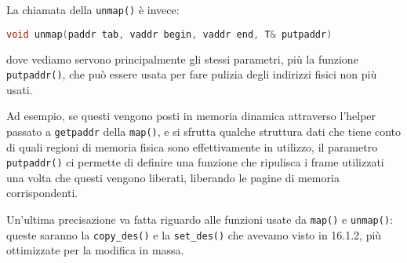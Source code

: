 \documentclass[a4paper,11pt]{article}
\begin{document}
La chiamata della \lstinline|unmap()| è invece:
\begin{lstlisting}[language=C++, style=codestyle]	
void unmap(paddr tab, vaddr begin, vaddr end, T& putpaddr)
\end{lstlisting}
dove vediamo servono principalmente gli stessi parametri, più la funzione \lstinline|putpaddr()|, che può essere usata per fare pulizia degli indirizzi fisici non più usati.

Ad esempio, se questi vengono posti in memoria dinamica attraverso l'helper passato a \lstinline|getpaddr| della \lstinline|map()|, e si sfrutta qualche struttura dati che tiene conto di quali regioni di memoria fisica sono effettivamente in utilizzo, il parametro \lstinline|putpaddr()| ci permette di definire una funzione che ripulisca i frame utilizzati una volta che questi vengono liberati, liberando le pagine di memoria corrispondenti.

Un'ultima precisazione va fatta riguardo alle funzioni usate da \lstinline|map()| e \lstinline|unmap()|: queste saranno la \lstinline|copy_des()| e la \lstinline|set_des()| che avevamo visto in 16.1.2, più ottimizzate per la modifica in massa.
\end{document}
